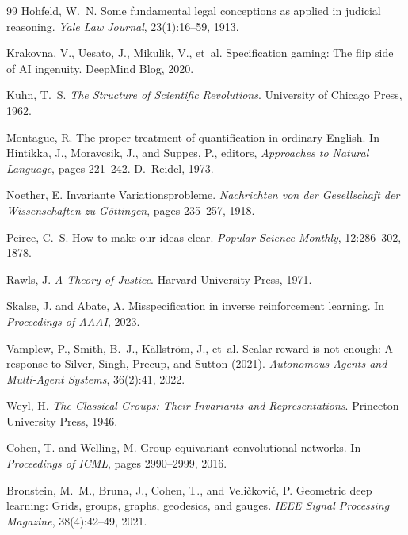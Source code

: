 \documentclass[12pt,letterpaper]{article}
\theoremstyle{definition}
\theoremstyle{plain}
\begin{document}
\begin{thebibliography}{99}
Hohfeld, W.~N.
\newblock Some fundamental legal conceptions as applied in judicial reasoning.
\newblock \emph{Yale Law Journal}, 23(1):16--59, 1913.

Krakovna, V., Uesato, J., Mikulik, V., et~al.
\newblock Specification gaming: The flip side of AI ingenuity.
\newblock DeepMind Blog, 2020.

Kuhn, T.~S.
\newblock \emph{The Structure of Scientific Revolutions}.
\newblock University of Chicago Press, 1962.

Montague, R.
\newblock The proper treatment of quantification in ordinary {E}nglish.
\newblock In Hintikka, J., Moravcsik, J., and Suppes, P., editors, \emph{Approaches to Natural Language}, pages 221--242. D.~Reidel, 1973.

Noether, E.
\newblock Invariante Variationsprobleme.
\newblock \emph{Nachrichten von der Gesellschaft der Wissenschaften zu G\"{o}ttingen}, pages 235--257, 1918.

Peirce, C.~S.
\newblock How to make our ideas clear.
\newblock \emph{Popular Science Monthly}, 12:286--302, 1878.

Rawls, J.
\newblock \emph{A Theory of Justice}.
\newblock Harvard University Press, 1971.

Skalse, J. and Abate, A.
\newblock Misspecification in inverse reinforcement learning.
\newblock In \emph{Proceedings of AAAI}, 2023.

Vamplew, P., Smith, B.~J., K\"{a}llstr\"{o}m, J., et~al.
\newblock Scalar reward is not enough: A response to Silver, Singh, Precup, and Sutton (2021).
\newblock \emph{Autonomous Agents and Multi-Agent Systems}, 36(2):41, 2022.

Weyl, H.
\newblock \emph{The Classical Groups: Their Invariants and Representations}.
\newblock Princeton University Press, 1946.

Cohen, T. and Welling, M.
\newblock Group equivariant convolutional networks.
\newblock In \emph{Proceedings of ICML}, pages 2990--2999, 2016.

Bronstein, M.~M., Bruna, J., Cohen, T., and Veli\v{c}kovi\'{c}, P.
\newblock Geometric deep learning: Grids, groups, graphs, geodesics, and gauges.
\newblock \emph{IEEE Signal Processing Magazine}, 38(4):42--49, 2021.


\end{thebibliography}
\end{document}
